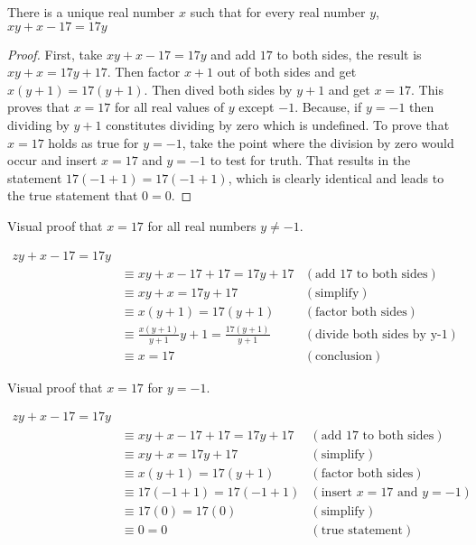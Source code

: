 
\begin{theorem}
  There is a unique real number $x$ such that for every real number $y$, $xy+x-17=17y$
\end{theorem}

\begin{proof}
  First, take $xy+x-17=17y$ and add $17$ to both sides, the result is
  $xy+x=17y+17$. Then factor $x+1$ out of both sides and get $x(y+1)=17(y+1)$.
  Then dived both sides by $y+1$ and get $x=17$. This proves that $x=17$ for all
  real values of $y$ except $-1$. Because, if $y=-1$ then dividing by $y+1$
  constitutes dividing by zero which is undefined. To prove that $x=17$ holds as
  true for $y=-1$, take the point where the division by zero would occur and
  insert $x=17$ and $y=-1$ to test for truth. That results in the statement
  $17(-1+1)=17(-1+1)$, which is clearly identical and leads to the true
  statement that $0=0$.
\end{proof}

Visual proof that $x=17$ for all real numbers $y \ne -1$.

\begin{align*}
  zy+x-17=17y\\
  &\equiv xy+x-17+17=17y+17 &(\textrm{add 17 to both sides})\\
  &\equiv xy+x=17y+17 &(\textrm{simplify})\\
  &\equiv x(y+1)=17(y+1) &(\textrm{factor both sides})\\
  &\equiv \frac{x(y+1)}{y+1}{y+1}=\frac{17(y+1)}{y+1} &(\textrm{divide both
  sides by y-1})\\
  &\equiv x=17 &(\textrm{conclusion})
\end{align*}


Visual proof that $x=17$ for $y = -1$.

\begin{align*}
  zy+x-17=17y\\
  &\equiv xy+x-17+17=17y+17 &(\textrm{add 17 to both sides})\\
  &\equiv xy+x=17y+17 &(\textrm{simplify})\\
  &\equiv x(y+1)=17(y+1) &(\textrm{factor both sides})\\
  &\equiv 17(-1+1)=17(-1+1) &(\textrm{insert $x=17$ and $y=-1$})\\
  &\equiv 17(0)=17(0) &(\textrm{simplify})\\
  &\equiv 0=0 &(\textrm{true statement})
\end{align*}
